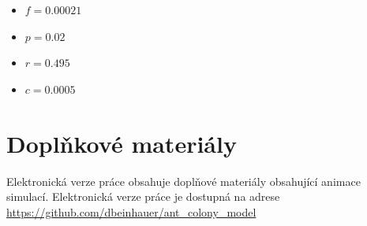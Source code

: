 \documentclass[10pt,a4paper,twocolumn]{article}
\begin{document}
\begin{itemize}
  \item $f = 0.00021$
  \item $p = 0.02$
  \item $r = 0.495$
  \item $c = 0.0005$
\end{itemize}


\clearpage



\section*{Doplňkové materiály}
Elektronická verze práce obsahuje doplňové materiály obsahující
animace simulací. Elektronická verze práce je dostupná na adrese
\url{https://github.com/dbeinhauer/ant_colony_model}
\end{document}
